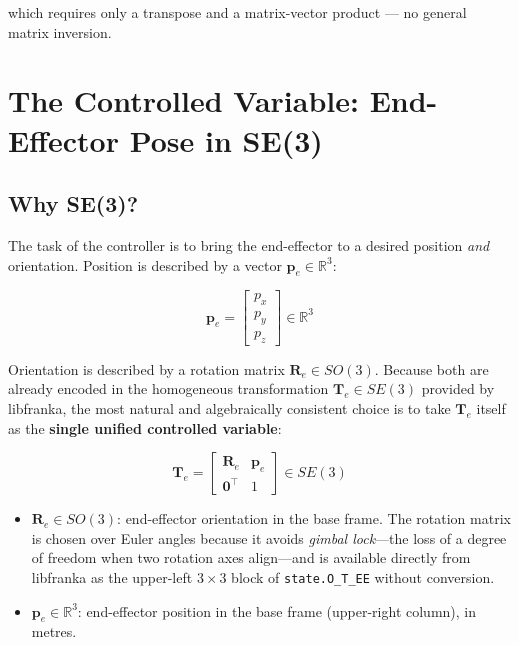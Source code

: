 which requires only a transpose and a matrix-vector product — no
general matrix inversion.

\section{The Controlled Variable: End-Effector Pose in SE(3)}
\label{sec:pose}

\subsection{Why SE(3)?}
\label{subsec:ctrl_vars}

The task of the controller is to bring the end-effector to a desired
position \emph{and} orientation.
Position is described by a vector
$\mathbf{p}_e\in\mathbb{R}^3$:

\begin{equation}
\label{eq:pos_vec}
\mathbf{p}_e =
\begin{bmatrix} p_x \\ p_y \\ p_z \end{bmatrix}
\in\mathbb{R}^3
\end{equation}

Orientation is described by a rotation matrix
$\mathbf{R}_e\in SO(3)$.
Because both are already encoded in the homogeneous transformation
$\mathbf{T}_e\in SE(3)$ provided by libfranka, the most natural and
algebraically consistent choice is to take $\mathbf{T}_e$ itself as
the \textbf{single unified controlled variable}:

\begin{equation}
\label{eq:pose}
\mathbf{T}_e =
\begin{bmatrix}
\mathbf{R}_e & \mathbf{p}_e \\
\mathbf{0}^\top & 1
\end{bmatrix}
\in SE(3)
\end{equation}

\begin{itemize}
  \item $\mathbf{R}_e\in SO(3)$: end-effector orientation in the base
        frame.
        The rotation matrix is chosen over Euler angles because it
        avoids \emph{gimbal lock}---the loss of a degree of freedom when
        two rotation axes align---and is available directly from
        libfranka as the upper-left $3{\times}3$ block of
        \mbox{\texttt{state.O\_T\_EE}} without conversion.
  \item $\mathbf{p}_e\in\mathbb{R}^3$: end-effector position in the
        base frame (upper-right column), in metres.
\end{itemize}

